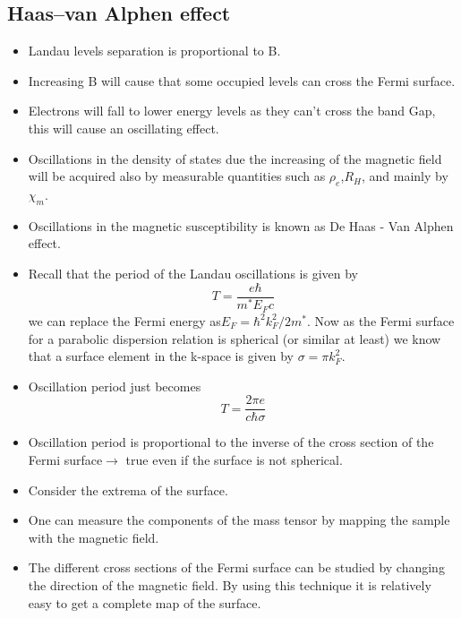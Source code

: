 \documentclass{beamer}
\begin{document}
\subsection{ Haas–van Alphen effect}
\begin{frame}
  \begin{itemize}
      \item Landau levels separation is proportional to B.
      \item Increasing B will cause that some occupied levels can cross the Fermi surface.
      \item Electrons will fall to lower energy levels as they can't cross the band Gap, this will cause an oscillating effect.
      \item Oscillations in the density of states due the increasing of the magnetic field will be acquired also by measurable quantities such as $\rho_e$,$R_H$, and mainly by $\chi_m$.
      \item Oscillations in the magnetic susceptibility is known as De Haas - Van Alphen effect.
  \end{itemize}
\end{frame}
\begin{frame}
  \begin{itemize}
      \item Recall that the period of the Landau oscillations is given by
      \begin{equation}
          T=\frac{e\hbar}{m^* E_F c}
      \end{equation}
      we can replace the Fermi energy as$E_F= \hbar^2 k_F^2/2m^*$. Now as the Fermi surface for a parabolic dispersion relation is spherical (or similar at least) we know that a surface element in the k-space is given by $\sigma= \pi k_F^2$.
      \item Oscillation period just becomes
      \begin{equation}
          T=\frac{2\pi e}{c\hbar\sigma}
          \label{eq:per}
      \end{equation}
      \end{itemize}
\end{frame}
\begin{frame}
  \begin{itemize}
      \item Oscillation period is proportional to the inverse of the cross section of the Fermi surface$\rightarrow$ true even if the surface is not spherical.
      \item Consider the extrema of the surface.
      \item One can measure the components of the mass tensor by mapping the sample with the magnetic field.
      \item The different cross sections of the Fermi surface can be studied by changing the direction of the magnetic field. By using this technique it is relatively easy to get a complete map of the surface.
     
  \end{itemize}
\end{frame}
\end{document}

